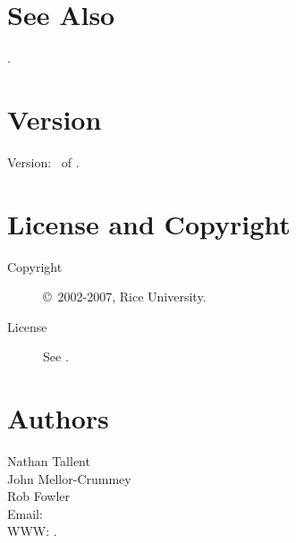 \documentclass[english]{article}
\begin{document}


\section{See Also}

.

\section{Version}

Version: \Version\ of \Date.

\section{License and Copyright}

\begin{description}
\item[Copyright] \copyright\ 2002-2007, Rice University.
\item[License] See .
\end{description}

\section{Authors}

\noindent
Nathan Tallent \\
John Mellor-Crummey \\
Rob Fowler \\
Email:  \\
WWW: .

\LatexManEnd
\end{document}

